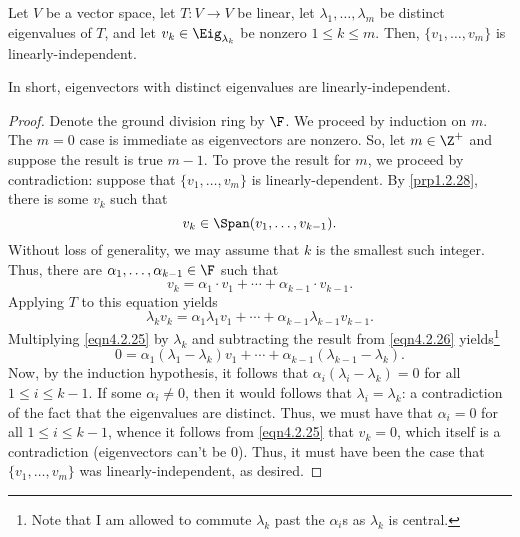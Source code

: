 \begin{prp}{}{}
	Let $V$ be a vector space, let $T\colon V\rightarrow V$ be linear, let $\lambda _1,\ldots ,\lambda _m$ be distinct eigenvalues of $T$, and let $v_k\in \Eig _{\lambda _k}$ be nonzero $1\leq k\leq m$.  Then, $\{ v_1,\ldots ,v_m\}$ is linearly-independent.
	\begin{rmk}
		In short, eigenvectors with distinct eigenvalues are linearly-independent.
	\end{rmk}
	\begin{proof}
		Denote the ground division ring by $\F$.  We proceed by induction on $m$.  The $m=0$ case is immediate as eigenvectors are nonzero.  So, let $m\in \Z ^+$ and suppose the result is true $m-1$.  To prove the result for $m$, we proceed by contradiction:  suppose that $\{ v_1,\ldots ,v_m\}$ is linearly-dependent.  By \cref{prp1.2.28}, there is some $v_k$ such that
		\begin{equation}
			v_k\in \Span (v_1,\ldots ,v_{k-1}).
		\end{equation}
		Without loss of generality, we may assume that $k$ is the smallest such integer.  Thus, there are $\alpha _1,\ldots ,\alpha _{k-1}\in \F$ such that
		\begin{equation}\label{eqn4.2.25}
			v_k=\alpha _1\cdot v_1+\cdots +\alpha _{k-1}\cdot v_{k-1}.
		\end{equation}
		Applying $T$ to this equation yields
		\begin{equation}\label{eqn4.2.26}
			\lambda _kv_k=\alpha _1\lambda _1v_1+\cdots +\alpha _{k-1}\lambda _{k-1}v_{k-1}.
		\end{equation}
		Multiplying \eqref{eqn4.2.25} by $\lambda _k$ and subtracting the result from \eqref{eqn4.2.26} yields\footnote{Note that I am allowed to commute $\lambda _k$ past the $\alpha _i$s as $\lambda _k$ is central.}
		\begin{equation}
			0=\alpha _1(\lambda _1-\lambda _k)v_1+\cdots +\alpha _{k-1}(\lambda _{k-1}-\lambda _k).
		\end{equation}
		Now, by the induction hypothesis, it follows that $\alpha _i(\lambda _i-\lambda _k)=0$ for all $1\leq i\leq k-1$.  If some $\alpha _i\neq 0$, then it would follows that $\lambda _i=\lambda _k$:  a contradiction of the fact that the eigenvalues are distinct.  Thus, we must have that $\alpha _i=0$ for all $1\leq i\leq k-1$, whence it follows from \eqref{eqn4.2.25} that $v_k=0$, which itself is a contradiction (eigenvectors can't be $0$).  Thus, it must have been the case that $\{ v_1,\ldots ,v_m\}$ was linearly-independent, as desired.
	\end{proof}
\end{prp}
